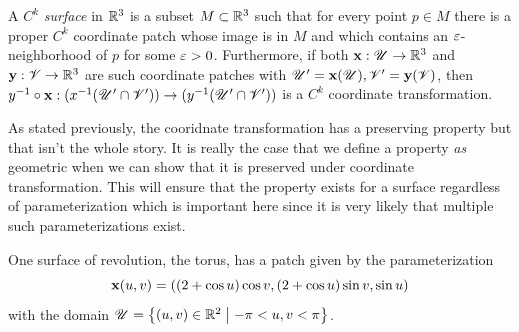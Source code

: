 \begin{defn} %
  A $C^k$ \emph{surface} in $\mathbb{R}^3$ is a subset $M \subset \mathbb{R}^3$ such that for every point $p \in M$ there is a proper $C^k$ coordinate patch whose image is in $M$ and which contains an $\varepsilon$-neighborhood of $p$ for some $\varepsilon > 0$. Furthermore, if both $\mathbf{x}: \mathscr{U} \to \mathbb{R}^3$ and $\mathbf{y}: \mathscr{V} \to \mathbb{R}^3$ are such coordinate patches with $\mathscr{U}^\prime = \mathbf{x}(\mathscr{U}), \mathscr{V}^\prime = \mathbf{y}(\mathscr{V})$, then $y^{-1} \circ \mathbf{x}: (x^{-1}(\mathscr{U}^\prime \cap \mathscr{V}^\prime)) \to (y^{-1}(\mathscr{U}^\prime \cap \mathscr{V}^\prime))$ is a $C^k$ coordinate transformation.
\end{defn}

As stated previously, the cooridnate transformation has a preserving property but that isn't the whole story. It is really the case that we define a property \emph{as} geometric when we can show that it is preserved under coordinate transformation. This will ensure that the property exists for a surface regardless of parameterization which is important here since it is very likely that multiple such parameterizations exist.




One surface of revolution, the torus, has a patch given by the parameterization
\[
  \mathbf{x}(u, v) = ((2 + \cos u)\cos v, (2 + \cos u) \sin v, \sin u)
\]
with the domain $\mathscr{U} = \left\{(u, v) \in \mathbb{R}^2\;\middle\vert\;-\pi < u, v < \pi\right\}$.

